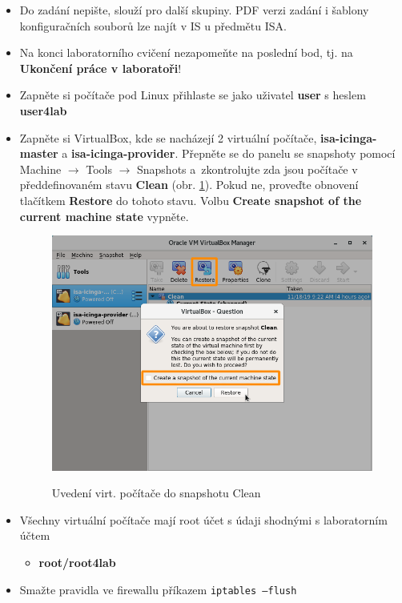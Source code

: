 \begin{itemize}
  \item Do zadání nepište, slouží pro další skupiny. PDF verzi zadání
  i šablony konfiguračních souborů lze najít v IS u předmětu ISA.
  
  \item Na konci laboratorního cvičení nezapomeňte na poslední bod,
  tj. na {\bf Ukončení práce v laboratoři}!
  
  \item Zapněte si počítače pod Linux přihlaste se jako uživatel {\bf user} s heslem {\bf user4lab}
  \item Zapněte si VirtualBox, kde se nacházejí 2 virtuální počítače, {\bf isa-icinga-master} a {\bf isa-icinga-provider}. Přepněte se do panelu se snapshoty pomocí Machine $\rightarrow$ Tools $\rightarrow$ Snapshots a~zkontrolujte zda jsou počítače v předdefinovaném stavu {\bf Clean} (obr. \ref{fig:revert}). Pokud ne, proveďte obnovení tlačítkem {\bf Restore} do tohoto stavu. Volbu {\bf Create snapshot of the current machine state} vypněte.
  
  \begin{figure}[!ht]
  	\caption{Uvedení virt. počítače do snapshotu Clean}
  	\centering
  	\includegraphics[width=0.67\linewidth]{files/vbox-revert.PNG}
 	\label{fig:revert}
  \end{figure}

  \item Všechny virtuální počítače mají root účet s údaji shodnými s laboratorním účtem
            \begin{itemize}
                \item {\bf root/root4lab}
            \end{itemize}
  \item Smažte pravidla ve firewallu příkazem {\tt iptables --flush}
\end{itemize}

